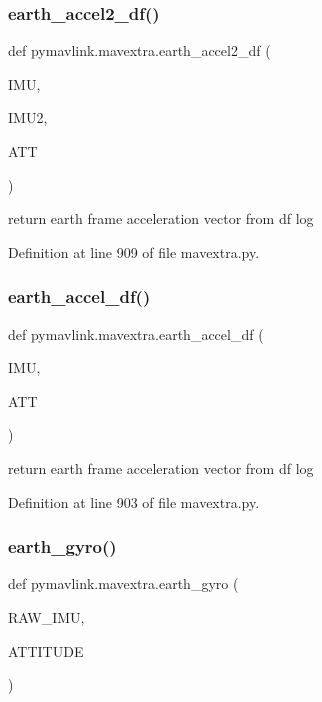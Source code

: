 \subsubsection{\texorpdfstring{earth\_accel2\_df()}{earth\_accel2\_df()}}
{\footnotesize\ttfamily def pymavlink.\+mavextra.\+earth\+\_\+accel2\+\_\+df (\begin{DoxyParamCaption}\item[{}]{I\+MU,  }\item[{}]{I\+M\+U2,  }\item[{}]{A\+TT }\end{DoxyParamCaption})}

\begin{DoxyVerb}return earth frame acceleration vector from df log\end{DoxyVerb}
 

Definition at line 909 of file mavextra.\+py.

\mbox{\label{namespacepymavlink_1_1mavextra_a51880208595cc665f7dd2af3e44390f2}} 
\subsubsection{\texorpdfstring{earth\_accel\_df()}{earth\_accel\_df()}}
{\footnotesize\ttfamily def pymavlink.\+mavextra.\+earth\+\_\+accel\+\_\+df (\begin{DoxyParamCaption}\item[{}]{I\+MU,  }\item[{}]{A\+TT }\end{DoxyParamCaption})}

\begin{DoxyVerb}return earth frame acceleration vector from df log\end{DoxyVerb}
 

Definition at line 903 of file mavextra.\+py.

\mbox{\label{namespacepymavlink_1_1mavextra_ad31722417bd0b051505d2a9f7e70183a}} 
\subsubsection{\texorpdfstring{earth\_gyro()}{earth\_gyro()}}
{\footnotesize\ttfamily def pymavlink.\+mavextra.\+earth\+\_\+gyro (\begin{DoxyParamCaption}\item[{}]{R\+A\+W\+\_\+\+I\+MU,  }\item[{}]{A\+T\+T\+I\+T\+U\+DE }\end{DoxyParamCaption})}

